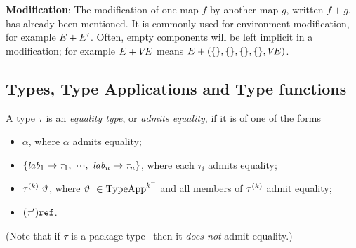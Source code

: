 {\bf Modification}: The modification of one map $f$ by another map $g$,
written $f+g$, has already been mentioned.  It is commonly used for
environment modification, for example $\E+\E'$.  Often, empty components
will be left implicit in a modification; for example $\E+\VE$ means
$\E+(\emptymap,\emptymap,\emptymap,\emptymap,\VE)$.  %



\subsection{Types, Type Applications and Type functions} %
\label{tyfun-sec}
A type $\tau$ is an {\sl equality type}, or {\sl admits equality}, if it is
of one of the forms
\begin{itemize}
\item $\alpha$, where $\alpha$ admits equality;
\item $\{\lab_1\mapsto\tau_1,\ \cdots,\ \lab_n\mapsto\tau_n\}$,
      where each $\tau_i$ admits equality;
\item $\apptype{\tauk}{\typeapp}$, where $\typeapp\ \in \TypeApp[\keq]$  and all members of $\tauk$ admit equality; %
\item $(\tau')\REF$.
\end{itemize}
(Note that  if $\tau$ is a package type \longpackagetype\ then 
it \emph{does not} admit equality.)



